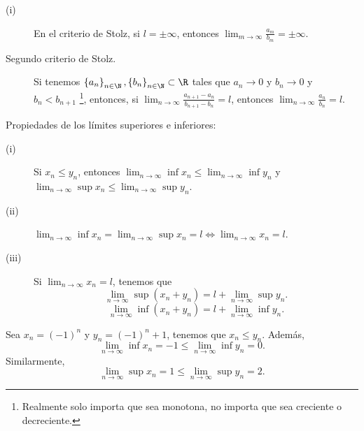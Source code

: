 \begin{observation}
\normalfont 
\begin{description}
\item[(i)] En el criterio de Stolz, si $\displaystyle l = \pm \infty $, entonces $\displaystyle \lim_{m \to \infty}\frac{a_{m}}{b_{m}} = \pm \infty $. 
\item[Segundo criterio de Stolz.] Si tenemos $\displaystyle \left\{ a_{n}\right\} _{n\in\N}, \left\{ b_{n}\right\} _{n\in\N}\subset\R $ tales que $\displaystyle a_{n} \to 0 $ y $\displaystyle b_{n} \to 0 $ y $\displaystyle b_{n} < b_{n+1} $ \footnote{Realmente solo importa que sea monotona, no importa que sea creciente o decreciente.}, entonces, si $\displaystyle \lim_{n \to \infty}\frac{a_{n+1}-a_{n}}{b_{n+1}-b_{n}} = l $, entonces $\displaystyle \lim_{n \to \infty}\frac{a_{n}}{b_{n}} = l $.  
\end{description}
\end{observation}

\begin{observation}
\normalfont Propiedades de los límites superiores e inferiores:
\begin{description}
\item[(i)] Si $\displaystyle x_{n} \leq y_{n} $, entonces $\displaystyle \lim_{n \to \infty}\inf x_{n} \leq \lim_{n \to \infty}\inf y_{n} $ y $\displaystyle \lim_{n \to \infty}\sup x_{n} \leq \lim_{n \to \infty} \sup y_{n} $. 
\item[(ii)] $\displaystyle \lim_{n \to \infty} \inf x_{n} = \lim_{n \to \infty}\sup x_{n} = l \iff \lim_{n \to \infty}x_{n} = l $.
\item[(iii)] Si $\displaystyle \lim_{n \to \infty}x_{n} = l $, tenemos que 
	\[\lim_{n \to \infty}\sup\left(x_{n}+y_{n}\right) = l + \lim_{n \to \infty}\sup y_{n} .\]
	\[\lim_{n \to \infty}\inf\left(x_{n}+y_{n}\right) = l + \lim_{n \to \infty}\inf y_{n} .\]
\end{description}
\end{observation}

\begin{eg}
\normalfont Sea $\displaystyle x_{n} = \left(-1\right)^{n} $ y $\displaystyle y_{n} = \left(-1\right)^{n}+1 $, tenemos que $\displaystyle x_{n} \leq y_{n} $. Además, 
\[\lim_{n \to \infty}\inf x_{n} = -1 \leq \lim_{n \to \infty } \inf y_{n} = 0 .\]
Similarmente, 
\[\lim_{n \to \infty}\sup x_{n} = 1 \leq \lim_{n \to \infty}\sup y_{n} = 2 .\]
\end{eg}


